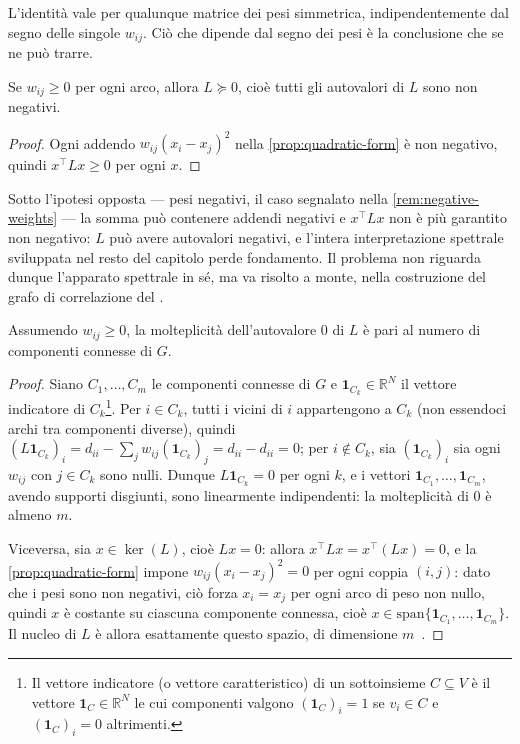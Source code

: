 L'identità vale per qualunque matrice dei pesi simmetrica, indipendentemente dal segno delle singole $w_{ij}$. Ciò che dipende dal segno dei pesi è la conclusione che se ne può trarre.

\begin{proposition}
\label{prop:psd}
Se $w_{ij}\geq 0$ per ogni arco, allora $L \succeq 0$, cioè tutti gli autovalori di $L$ sono non negativi.
\end{proposition}

\begin{proof}
Ogni addendo $w_{ij}(x_i-x_j)^2$ nella \cref{prop:quadratic-form} è non negativo, quindi $x^\top Lx \geq 0$ per ogni $x$. \qedhere
\end{proof}

Sotto l'ipotesi opposta — pesi negativi, il caso segnalato nella \cref{rem:negative-weights} — la somma può contenere addendi negativi e $x^\top Lx$ non è più garantito non negativo: $L$ può avere autovalori negativi, e l'intera interpretazione spettrale sviluppata nel resto del capitolo perde fondamento. Il problema non riguarda dunque l'apparato spettrale in sé, ma va risolto a monte, nella costruzione del grafo di correlazione del .

\begin{proposition}
\label{prop:zero-multiplicity}
Assumendo $w_{ij}\geq 0$, la molteplicità dell'autovalore $0$ di $L$ è pari al numero di componenti connesse di $G$.
\end{proposition}

\begin{proof}
Siano $C_1,\dots,C_m$ le componenti connesse di $G$ e $\mathbf{1}_{C_k}\in\mathbb{R}^N$ il vettore indicatore di $C_k$\footnote{Il vettore indicatore (o vettore caratteristico) di un sottoinsieme $C\subseteq V$ è il vettore $\mathbf{1}_C\in\mathbb{R}^N$ le cui componenti valgono $(\mathbf{1}_C)_i=1$ se $v_i\in C$ e $(\mathbf{1}_C)_i=0$ altrimenti.}. Per $i \in C_k$, tutti i vicini di $i$ appartengono a $C_k$ (non essendoci archi tra componenti diverse), quindi $(L\mathbf{1}_{C_k})_i = d_{ii} - \sum_{j} w_{ij}(\mathbf{1}_{C_k})_j = d_{ii} - d_{ii} = 0$; per $i \notin C_k$, sia $(\mathbf{1}_{C_k})_i$ sia ogni $w_{ij}$ con $j \in C_k$ sono nulli. Dunque $L\mathbf{1}_{C_k}=0$ per ogni $k$, e i vettori $\mathbf{1}_{C_1},\dots,\mathbf{1}_{C_m}$, avendo supporti disgiunti, sono linearmente indipendenti: la molteplicità di $0$ è almeno $m$.

Viceversa, sia $x\in\ker(L)$, cioè $Lx=0$: allora $x^\top Lx = x^\top(Lx) = 0$, e la \cref{prop:quadratic-form} impone $w_{ij}(x_i-x_j)^2=0$ per ogni coppia $(i,j)$: dato che i pesi sono non negativi, ciò forza $x_i=x_j$ per ogni arco di peso non nullo, quindi $x$ è costante su ciascuna componente connessa, cioè $x\in\mathrm{span}\{\mathbf{1}_{C_1},\dots,\mathbf{1}_{C_m}\}$. Il nucleo di $L$ è allora esattamente questo spazio, di dimensione $m$~\cite{chung1997spectral}. \qedhere
\end{proof}

